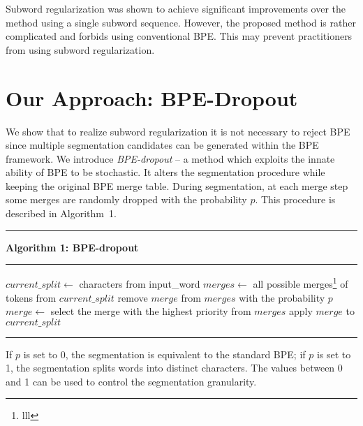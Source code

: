 \documentclass[11pt,a4paper]{article}
\begin{document}
Subword regularization was shown to achieve significant improvements over the method using a single subword sequence. However, the proposed method is rather complicated and forbids using conventional BPE. This may prevent practitioners from using subword regularization.

 
\section{Our Approach: BPE-Dropout}\label{sec:method}



We show that to realize subword regularization it is not necessary to reject BPE since multiple segmentation candidates can be generated within the BPE framework. We introduce \textit{BPE-dropout} -- a method which exploits the innate ability of BPE to be stochastic. It alters the segmentation procedure while keeping the original BPE merge table. During segmentation, at each merge step some merges are randomly dropped with the probability $p$. This procedure is described in Algorithm~1.

\vspace{-1ex}


\begin{algorithm}
 \vspace{5px}
 \hrule
 \vspace{3px}
 \textbf{Algorithm 1: BPE-dropout} \hrule
 \label{alg:bpedrop}
    $ current\_split  \leftarrow $ characters from input\_word\;
     {
        $ merges  \leftarrow $ all possible merges\footnote{lll} of tokens from $ current\_split $\;
         {
            remove $ merge $ from $ merges $ with the probability $ p $\; } 
         {
            $ merge  \leftarrow $ select the merge with the highest priority from $ merges $\;
            apply $ merge $ to $ current\_split $\;
        }
    }
    \;
 \hrule
 
\end{algorithm}

 \vspace{-1ex}


If $p$ is set to 0, the segmentation is equivalent to the standard BPE; if $p$ is set to 1, the segmentation splits words into distinct characters. The values between 0 and 1 can be used to control the segmentation granularity. 
\end{document}
